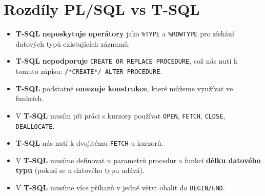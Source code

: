 \section{Rozdíly PL/SQL vs T-SQL}
\begin{itemize}
    \item \textbf{T-SQL} \textbf{neposkytuje operátory} jako \texttt{\%TYPE} a \texttt{\%ROWTYPE} pro získání datových typů existujících záznamů.
    \item \textbf{T-SQL} \textbf{nepodporuje} \texttt{CREATE OR REPLACE PROCEDURE}, což nás nutí k tomuto zápisu: \texttt{/*CREATE*/ ALTER PROCEDURE}.
    \item \textbf{T-SQL} podstatně \textbf{omezuje konstrukce}, které můžeme využívat ve funkcích.
    \item V \textbf{T-SQL} musím při práci s kurzory používat \texttt{OPEN}, \texttt{FETCH}, \texttt{CLOSE}, \texttt{DEALLOCATE}.
    \item \textbf{T-SQL} nás nutí k dvojitému \texttt{FETCH} u kurzorů.
    \item V \textbf{T-SQL} musíme definovat u parametrů procedur a funkcí \textbf{délku datového typu} (pokud se u datového typu udává).
    \item V \textbf{T-SQL} musíme více příkazů v jedné větvi obalit do \texttt{BEGIN/END}.
\end{itemize}


